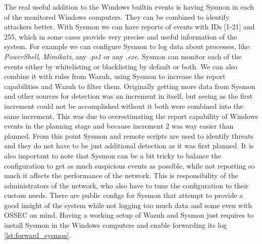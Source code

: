 \linej
The real useful addition to the Windows builtin events is having Sysmon\cite{sysmon} in each of the monitored Windows computers. They can be combined to identify attackers better\cite{detection_events}.
\linej
With Sysmon we can have reports of events with IDs [1-21] and 255, which in some cases provide very precise and useful information of the system. For example we can configure Sysmon to log data about processes, like: \textit{PowerShell}, \textit{Mimikatz}, any \textit{.ps1} or any \textit{.exe}.
Sysmon can monitor each of the events either by whitelisting or blacklisting by default or both. We can also combine it with rules from Wazuh, using Sysmon to increase the report capabilities and Wazuh to filter them.
\linej
\linej
\label{increment_explanation}
Originally getting more data from Sysmon and other sources for detection was an increment in itself, but seeing as the first increment could not be accomplished without it both were combined into the same increment.
This was due to overestimating the report capability of Windows events in the planning stage and because increment 2 was way easier than planned.
From this point Sysmon and remote scripts are used to identify threats and they do not have to be just additional detection as it was first planned.
\linej
\linej
It is also important to note that Sysmon can be a bit tricky to balance the configuration to get as much suspicious events as possible, while not reporting so much it affects the performance of the network. This is responsibility of the administrators of the network, who also have to tune the configuration to their custom needs.
There are public configs for Sysmon that attempt to provide a good insight of the system while not logging too much data\cite{sysmon_config} and some even with OSSEC on mind\cite{ossec_sysmon}.
\linej
\linej
Having a working setup of Wazuh and Sysmon just requires to install Sysmon in the Windows computers and enable forwarding its log \ref{lst:forward_sysmon}.

